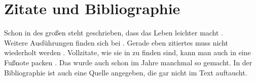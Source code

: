 \cleardoublepage
\chapter{Zitate und Bibliographie}\label{ch:conclusion}

Schon in  des großen \citeauthor{aristotle:anima} steht geschrieben, dass  das Leben leichter macht \parencite[12]{moraux}.\\
Weitere Ausführungen finden sich bei \textcite{knuth:ct}. Gerade eben zitiertes muss nicht wiederholt werden \parencite{knuth:ct}. Vollzitate, wie sie in  zu finden sind, kann man auch in eine Fußnote packen . Das wurde auch schon im Jahre \citeyear{doody} manchmal so gemacht. In der Bibliographie ist auch eine Quelle angegeben, die gar nicht im Text auftaucht. \nocite{westfahl:space}
